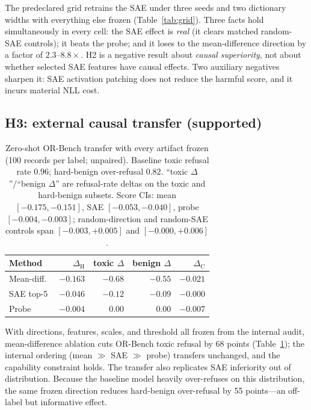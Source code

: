 \documentclass[11pt]{article}
\newcommand{\dH}{\ensuremath{\Delta_{\mathrm{H}}}}
\newcommand{\dC}{\ensuremath{\Delta_{\mathrm{C}}}}
\begin{document}
The predeclared grid retrains the SAE under three seeds and two dictionary
widths with everything else frozen (Table~\ref{tab:grid}).  Three facts hold
simultaneously in every cell: the SAE effect is \emph{real} (it clears matched
random-SAE controls); it beats the probe; and it loses to the mean-difference
direction by a factor of $2.3$--$8.8\times$.  H2 is a negative result about
\emph{causal superiority}, not about whether selected SAE features have causal
effects.  Two auxiliary negatives sharpen it: SAE activation patching does not
reduce the harmful score, and it incurs material NLL cost.

\subsection{H3: external causal transfer (supported)}
\label{sec:h3}

\begin{table}[t]
\centering
\small
\begin{tabular}{@{}lrrrr@{}}
\toprule
Method & \dH{} & toxic $\Delta$ & benign $\Delta$ & \dC{} \\
\midrule
Mean-diff.\ & $-0.163$ & $\mathbf{-0.68}$ & $-0.55$ & $-0.021$ \\
SAE top-5 & $-0.046$ & $-0.12$ & $-0.09$ & $-0.000$ \\
Probe & $-0.004$ & $0.00$ & $0.00$ & $-0.007$ \\
\bottomrule
\end{tabular}
\caption{Zero-shot OR-Bench transfer with every artifact frozen (100 records
per label; unpaired).  Baseline toxic refusal rate $0.96$; hard-benign
over-refusal $0.82$.  ``toxic $\Delta$''/``benign $\Delta$'' are refusal-rate
deltas on the toxic and hard-benign subsets.  Score CIs:
mean $[-0.175,-0.151]$, SAE $[-0.053,-0.040]$, probe $[-0.004,-0.003]$;
random-direction and random-SAE controls span $[-0.003,+0.005]$ and
$[-0.000,+0.006]$.}
\label{tab:orbench}
\end{table}

With directions, features, scales, and threshold all frozen from the internal
audit, mean-difference ablation cuts OR-Bench toxic refusal by 68 points
(Table~\ref{tab:orbench}); the internal ordering (mean $\gg$ SAE $\gg$ probe)
transfers unchanged, and the capability constraint holds.  The transfer also
replicates SAE inferiority out of distribution.  Because the baseline model
heavily over-refuses on this distribution, the same frozen direction reduces
hard-benign over-refusal by 55 points---an off-label but informative effect.
\end{document}

